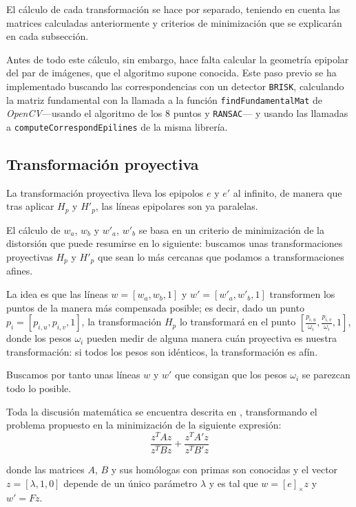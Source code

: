 \documentclass[a4paper, 11pt]{article}
\theoremstyle{definition}
\begin{document}
    El cálculo de cada transformación se hace por separado, teniendo en cuenta las matrices calculadas anteriormente y criterios de minimización que se explicarán en cada subsección.

    Antes de todo este cálculo, sin embargo, hace falta calcular la geometría epipolar del par de imágenes, que el algoritmo supone conocida. Este paso previo se ha implementado buscando las correspondencias con un detector \lstinline{BRISK}, calculando la matriz fundamental con la llamada a la función \lstinline{findFundamentalMat} de \emph{OpenCV}---usando el algoritmo de los 8 puntos y \lstinline{RANSAC}--- y usando las llamadas a \lstinline{computeCorrespondEpilines} de la misma librería.

    \subsection{Transformación proyectiva}
    La transformación proyectiva lleva los epipolos $e$ y $e'$ al infinito, de manera que tras aplicar $H_p$ y $H'_p$, las líneas epipolares son ya paralelas.

    El cálculo de $w_a$, $w_b$ y  $w'_a$, $w'_b$ se basa en un criterio de minimización de la distorsión que puede resumirse en lo siguiente: buscamos unas transformaciones proyectivas $H_p$ y $H'_p$ que sean lo más cercanas que podamos a transformaciones afines.

    La idea es que las líneas $w = [w_a, w_b, 1]$ y $w' = [w'_a, w'_b, 1]$ transformen los puntos de la manera más compensada posible; es decir, dado un punto $p_i = [p_{i,u}, p_{i,v}, 1]$, la transformación $H_p$ lo transformará en el punto $[\frac{p_{i,u}}{\omega_i}, \frac{p_{i,v}}{\omega_i}, 1]$, donde los pesos $\omega_i$ pueden medir de alguna manera cuán proyectiva es nuestra transformación: si todos los pesos son idénticos, la transformación es afín.

    Buscamos por tanto unas líneas $w$ y $w'$ que consigan que los pesos $\omega_i$ se parezcan todo lo posible.

    Toda la discusión matemática se encuentra descrita en \cite{LoopZhang}, transformando el problema propuesto en la minimización de la siguiente expresión:
    \begin{equation}
        \frac{z^TAz}{z^TBz} + \frac{z^TA'z}{z^TB'z}
        \label{eq_minz}
    \end{equation}

    donde las matrices $A$, $B$ y sus homólogas con primas son conocidas y el vector $z = [\lambda, 1, 0]$ depende de un único parámetro $\lambda$ y es tal que $w = [e]_\times z$ y $w' = Fz$.
\end{document}
